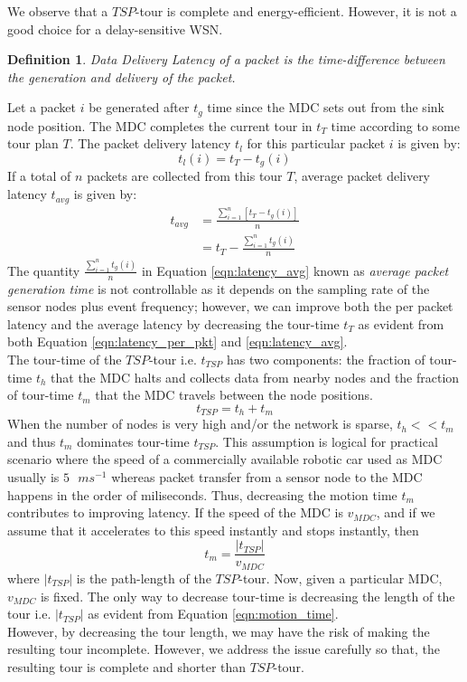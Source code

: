 \documentclass{llncs}
\newtheorem{mydef}{Definition}%
\begin{document}
We observe that a $TSP$-tour is complete and energy-efficient. However, it is not a good choice for
a delay-sensitive WSN.
\begin{mydef}
	Data Delivery Latency of a packet is the time-difference between the generation and delivery of the
	packet.
\end{mydef}
Let a packet $i$ be generated after $t_g$ time since the MDC sets out from the sink node position.
The MDC completes the current tour in $t_{T}$ time according to some tour plan $T$. The packet
delivery latency $t_l$ for this particular packet $i$ is given by:
\begin{equation}
	t_l(i) = t_{T}  -  t_g(i)
	\label{eqn:latency_per_pkt}
\end{equation}
If a total of $n$ packets are collected from this tour $T$, average packet delivery latency
$t_{avg}$ is given by:
\begin{align}
	t_{avg} &= \frac{\sum_{i=1}^n [t_{T}  -  t_g(i)]}{n} \nonumber \\
			&= t_{T}-\frac{\sum_{i=1}^n t_g(i)}{n}
	\label{eqn:latency_avg}
\end{align} 
The quantity $\frac{ \sum_{i=1}^n t_g(i)}{n}$ in Equation
\ref{eqn:latency_avg} known as \textit{average packet generation time} is not controllable as it depends on the 
sampling rate of
the sensor nodes plus event frequency; however, we can improve both  the per packet latency and the 
average latency by
decreasing the tour-time $t_{T}$ as evident from both Equation \ref{eqn:latency_per_pkt} and
\ref{eqn:latency_avg}.\\
The tour-time of the $TSP$-tour i.e. $t_{TSP}$ has two components:  the fraction of tour-time
$t_{h}$ that the MDC halts and collects data from nearby nodes and the fraction 
of tour-time $t_{m}$ that the
MDC travels between the node positions.
\begin{equation}
	t_{TSP}=t_h+t_m
\end{equation}
When the number of nodes is very high and/or the network is sparse, $t_h<<t_m$ and thus $t_m$
dominates tour-time $t_{TSP}$. This assumption is logical for practical scenario where the speed
of a commercially available robotic car used as MDC usually is $5\mbox{ }ms^{-1}$ whereas
packet transfer from a sensor node to the MDC happens in the order of miliseconds. Thus, decreasing
the  motion time $t_m$ contributes to improving latency. If the speed of the MDC is $v_{MDC}$, and
if we assume that it accelerates to this speed instantly and  stops instantly, then
\begin{equation}
	t_m=\frac{|t_{TSP}|}{v_{MDC}}
	\label{eqn:motion_time}
\end{equation}
where $|t_{TSP}|$ is the path-length of the $TSP$-tour. Now, given a
particular MDC, $v_{MDC}$ is fixed. The only way to decrease tour-time is decreasing the length
of the tour i.e. $|t_{TSP}|$ as evident from Equation \ref{eqn:motion_time}.\\
However, by decreasing the tour length, we may have the risk of making the resulting tour
incomplete.
However, we address the issue carefully so that, the resulting tour is complete and shorter than
$TSP$-tour.
\end{document}

